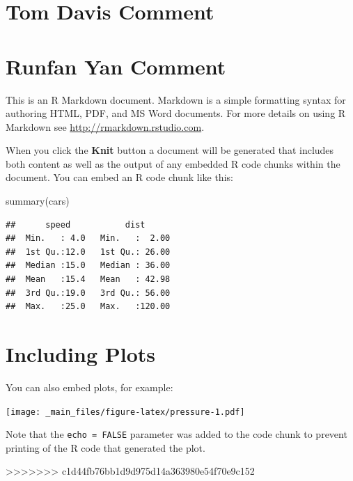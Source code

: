 \documentclass[
]{book}
\newenvironment{Shaded}{\begin{snugshade}}{\end{snugshade}}
\newcommand{\FunctionTok}[1]{\textcolor[rgb]{0.00,0.00,0.00}{#1}}
\newcommand{\NormalTok}[1]{#1}
\begin{document}
\hypertarget{tom-davis-comment}{%
\section{Tom Davis Comment}\label{tom-davis-comment}}

\hypertarget{runfan-yan-comment}{%
\section{Runfan Yan Comment}\label{runfan-yan-comment}}

This is an R Markdown document. Markdown is a simple formatting syntax for authoring HTML, PDF, and MS Word documents. For more details on using R Markdown see \url{http://rmarkdown.rstudio.com}.

When you click the \textbf{Knit} button a document will be generated that includes both content as well as the output of any embedded R code chunks within the document. You can embed an R code chunk like this:

\begin{Shaded}
\begin{Highlighting}[]
\FunctionTok{summary}\NormalTok{(cars)}
\end{Highlighting}
\end{Shaded}

\begin{verbatim}
##      speed           dist       
##  Min.   : 4.0   Min.   :  2.00  
##  1st Qu.:12.0   1st Qu.: 26.00  
##  Median :15.0   Median : 36.00  
##  Mean   :15.4   Mean   : 42.98  
##  3rd Qu.:19.0   3rd Qu.: 56.00  
##  Max.   :25.0   Max.   :120.00
\end{verbatim}

\hypertarget{including-plots}{%
\section{Including Plots}\label{including-plots}}

You can also embed plots, for example:

\texttt{[image: \_main\_files/figure-latex/pressure-1.pdf]}

Note that the \texttt{echo\ =\ FALSE} parameter was added to the code chunk to prevent printing of the R code that generated the plot.

>>>>>>> c1d44fb76bb1d9d975d14a363980e54f70e9c152
  
\end{document}
